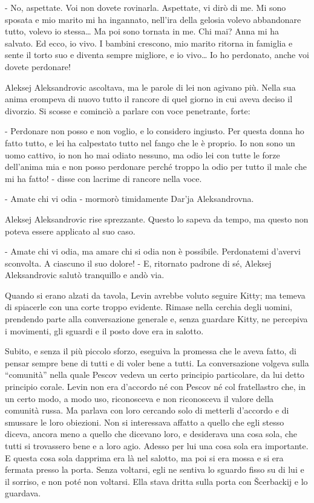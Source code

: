 - No, aspettate. Voi non dovete rovinarla. Aspettate, vi dirò di me. Mi sono sposata e mio marito mi ha ingannato, nell'ira della gelosia volevo abbandonare tutto, volevo io stessa\ldots{} Ma poi sono tornata in me. Chi mai? Anna mi ha salvato. Ed ecco, io vivo. I bambini crescono, mio marito ritorna in famiglia e sente il torto suo e diventa sempre migliore, e io vivo\ldots{} Io ho perdonato, anche voi dovete perdonare! 

Aleksej Aleksandrovic ascoltava, ma le parole di lei non agivano più. Nella sua anima erompeva di nuovo tutto il rancore di quel giorno in cui aveva deciso il divorzio. Si scosse e cominciò a parlare con voce penetrante, forte: 

- Perdonare non posso e non voglio, e lo considero ingiusto. Per questa donna ho fatto tutto, e lei ha calpestato tutto nel fango che le è proprio. Io non sono un uomo cattivo, io non ho mai odiato nessuno, ma odio lei con tutte le forze dell'anima mia e non posso perdonare perché troppo la odio per tutto il male che mi ha fatto! - disse con lacrime di rancore nella voce. 

- Amate chi vi odia - mormorò timidamente Dar'ja Aleksandrovna. 

Aleksej Aleksandrovic rise sprezzante. Questo lo sapeva da tempo, ma questo non poteva essere applicato al suo caso. 

- Amate chi vi odia, ma amare chi si odia non è possibile. Perdonatemi d'avervi sconvolta. A ciascuno il suo dolore! - E, ritornato padrone di sé, Aleksej Aleksandrovic salutò tranquillo e andò via. 

Quando si erano alzati da tavola, Levin avrebbe voluto seguire Kitty; ma temeva di spiacerle con una corte troppo evidente. Rimase nella cerchia degli uomini, prendendo parte alla conversazione generale e, senza guardare Kitty, ne percepiva i movimenti, gli sguardi e il posto dove era in salotto. 

Subito, e senza il più piccolo sforzo, eseguiva la promessa che le aveva fatto, di pensar sempre bene di tutti e di voler bene a tutti. La conversazione volgeva sulla ``comunità'' nella quale Pescov vedeva un certo principio particolare, da lui detto principio corale. Levin non era d'accordo né con Pescov né col fratellastro che, in un certo modo, a modo uso, riconosceva e non riconosceva il valore della comunità russa. Ma parlava con loro cercando solo di metterli d'accordo e di smussare le loro obiezioni. Non si interessava affatto a quello che egli stesso diceva, ancora meno a quello che dicevano loro, e desiderava una cosa sola, che tutti si trovassero bene e a loro agio. Adesso per lui una cosa sola era importante. E questa cosa sola dapprima era là nel salotto, ma poi si era mossa e si era fermata presso la porta. Senza voltarsi, egli ne sentiva lo sguardo fisso su di lui e il sorriso, e non poté non voltarsi. Ella stava dritta sulla porta con Šcerbackij e lo guardava. 

